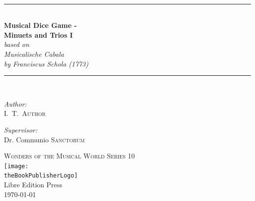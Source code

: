 \documentclass[a4paper,x11names,svgnames,10pt]{article}
\title{\textsc{\mdgBookTitle}}
\author{\textsc{\authorFirstMidNameInit \authorLastName}}
\date{\textsc{\dateGenerated}}
\def\authorFirstMidNameInit{I.\ T.\ }
\def\authorLastName{Author}
\def\dateGenerated{\today}
\def\volNumber{I}
\def\mdgBookTitle{Musical Dice Game - \\[0.15cm] Minuets and Trios \volNumber}
\def\mdgBookSubTitle{{\small based on}\\ Musicalische Cabala \\[0.15cm] by Franciscus Schola (1773)  }
\def\theBookSeries{Wonders of the Musical World Series 10}
\def\theBookPublisher{Libre Edition Press}
\def\theBookPublisherLogo{../images/1ed.png}
\newcommand{\HRule}{\rule{\linewidth}{0.5mm}}
\begin{document}
	


\newpage
{
${}_{}$\\
\vspace{1.00in}	
\thispagestyle{empty}
\begin{center}
	\HRule \\[0.4cm]
	{\huge \bfseries \mdgBookTitle} \\[0.2cm]
	{\large{\em \mdgBookSubTitle} }\\[0.2cm]
	\HRule \\[1.5cm]
	\begin{minipage}{0.4\textwidth}
		\begin{flushleft} \large
			\emph{Author:}\\
			\authorFirstMidNameInit \textsc{\authorLastName}
		\end{flushleft}
	\end{minipage}
	\begin{minipage}{0.4\textwidth}
		\begin{flushright} \large
			\emph{Supervisor:} \\
			Dr. Communio \textsc{Sanctorum}
		\end{flushright}
	\end{minipage}
	\vfill
	{\textsc{\Large \theBookSeries}}  \\[0.2cm] 
	\texttt{[image: \\theBookPublisherLogo]}\\ 
	{\large \theBookPublisher \\
		\dateGenerated }\\
	\vspace{2.50in}
\end{center}
\newpage


\tableofcontents\label{tabofcon}


\baselineskip 14pt

\newpage
}
\end{document}

